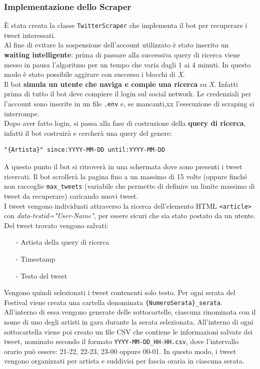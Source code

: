 \documentclass[a4paper,12pt]{article}
\begin{document}
\subsubsection{Implementazione dello Scraper}
È stata creata la classe \texttt{TwitterScraper} che implementa il bot per recuperare i tweet interessati.\\
Al fine di evitare la sospensione dell'account utilizzato è stato inserito un \textbf{waiting intelligente}: prima di passare alla successiva query di ricerca viene messo in pausa l'algoritmo per un tempo che varia dagli 1 ai 4 minuti. In questo modo è stato possibile aggirare con successo i blocchi di \textit{X}.\\
Il bot \textbf{simula un utente che naviga e compie una ricerca} su \textit{X}. Infatti prima di tutto il bot deve compiere il login sul social network. Le credenziali per l'account sono inserite in un file \texttt{.env} e, se mancanti,xx l'esecuzione di scraping si interrompe.\\
Dopo aver fatto login, si passa alla fase di costruzione della \textbf{query di ricerca}, infatti il bot costruirà e cercherà una query del genere:
\begin{verbatim}
"{Artista}" since:YYYY-MM-DD until:YYYY-MM-DD
\end{verbatim}
A questo punto il bot si ritroverà in una schermata dove sono presenti i tweet ricercati. Il bot scrollerà la pagina fino a un massimo di 15 volte (oppure finché non raccoglie \texttt{max\_tweets} (variabile che permette di definire un limite massimo di tweet da recuperare) caricando nuovi tweet.\\
I tweet vengono individuati attraverso la ricerca dell'elemento HTML \texttt{<article>} con \textit{data-testid="User-Name"}, per essere sicuri che sia stato postato da un utente. Del tweet trovato vengono salvati:
\begin{itemize}
    \item[-] Artista della query di ricerca
    \item[-] Timestamp
    \item[-] Testo del tweet
\end{itemize}
Vengono quindi selezionati i tweet contenenti solo testo.
Per ogni serata del Festival viene creata una cartella denominata \texttt{\{NumeroSerata\}\_serata}. All’interno di essa vengono generate delle sottocartelle, ciascuna rinominata con il nome di uno degli artisti in gara durante la serata selezionata. All'interno di ogni sottocartella viene poi creato un file CSV che contiene le informazioni salvate dei tweet, nominato secondo il formato \texttt{YYYY-MM-DD\_HH-HH.csv}, dove l’intervallo orario può essere: 21-22, 22-23, 23-00 oppure 00-01. In questo modo, i tweet vengono organizzati per artista e suddivisi per fascia oraria in ciascuna serata.\\
\end{document}
